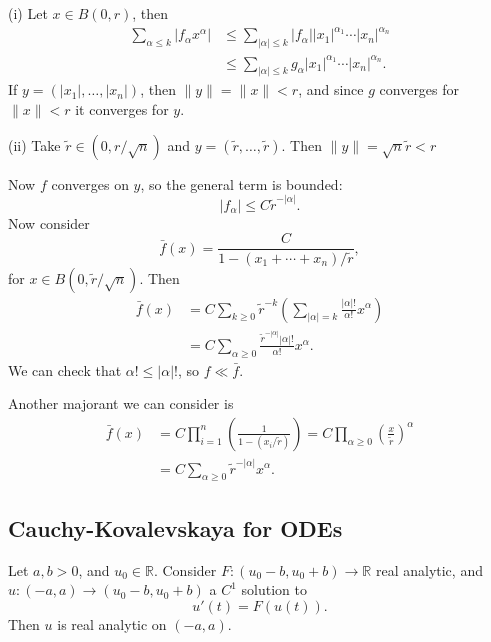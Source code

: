 \documentclass[12pt]{article}
\begin{document}
\begin{proofbox}
	

	(i) Let $x \in B(0, r)$, then
	\begin{align*}
		\sum_{\alpha \leq k} |f_\alpha x^\alpha| &\leq \sum_{|\alpha| \leq k} |f_\alpha| |x_1|^{\alpha_1} \cdots |x_n|^{\alpha_n} \\
							 &\leq \sum_{|\alpha| \leq k} g_\alpha |x_1|^{\alpha_1} \cdots |x_n|^{\alpha_n}.
	\end{align*}
	If $y = (|x_1|, \ldots, |x_n|)$, then $\|y\| = \|x\| < r$, and since $g$ converges for $\|x\| < r$ it converges for $y$.

	(ii) Take $\tilde r \in (0, r/\sqrt n)$ and $y = (\tilde r, \ldots, \tilde r)$. Then $\|y\| = \sqrt n \tilde r < r$ 

	Now $f$ converges on $y$, so the general term is bounded:
	\[
	|f_\alpha| \leq C \tilde r^{-|\alpha|}.
	\]
	Now consider
	\[
	\bar f(x) = \frac{C}{1 - (x_1 + \cdots + x_n)/\tilde r},
	\]
	for $x \in B(0, \tilde r/\sqrt n)$. Then
	\begin{align*}
		\bar f(x) &= C \sum_{k \geq 0} \tilde r^{-k} \left( \sum_{|\alpha| = k} \frac{|\alpha|!}{\alpha!} x^\alpha \right) \\
			  &= C \sum_{\alpha \geq 0} \frac{\tilde r^{-|\alpha|} |\alpha|!}{\alpha!} x^\alpha.
	\end{align*}
	We can check that $\alpha! \leq |\alpha|!$, so $f \ll \bar f$.

	Another majorant we can consider is
	\begin{align*}
		\bar f(x) &= C \prod_{i = 1}^n \left( \frac{1}{1 - (x_i/\tilde r)} \right) = C \prod_{\alpha \geq 0} \left( \frac{x}{\tilde r} \right)^{\alpha} \\
			  &= C \sum_{\alpha \geq 0} \tilde r^{-|\alpha|} x^\alpha.
	\end{align*}
\end{proofbox}

\subsection{Cauchy-Kovalevskaya for ODEs}%
\label{sub:ck_ode}

\begin{theorem}
	Let $a, b > 0$, and $u_0 \in \mathbb{R}$. Consider $F : (u_0 - b, u_0 + b) \to \mathbb{R}$ real analytic, and $u : (-a, a) \to (u_0 - b, u_0 + b)$ a $C^1$ solution to
	\[
	u'(t) = F(u(t)).
	\]
	Then $u$ is real analytic on $(-a, a)$.
\end{theorem}
\end{document}
